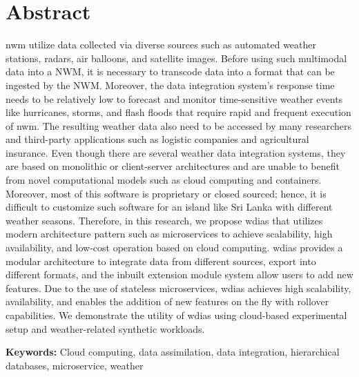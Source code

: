 \documentclass[a4paper,oneside,12pt]{report}
\newcommand{\dbc}[1]{\todo[author=Dilum, inline, color=blue!40]{#1}}
\newcommand{\gkc}[1]{\todo[author=Gihan, inline, color=green!50]{#1}}
\begin{document}
{ 

\chapter*{Abstract}

\acrfull{nwm} utilize data collected via diverse sources such as automated weather stations, radars, air balloons, and satellite images. Before using such multimodal data into a NWM, it is necessary to transcode data into a format that can be ingested by the NWM. Moreover, the data integration system's response time needs to be relatively low to forecast and monitor time-sensitive weather events like hurricanes, storms, and flash floods that require rapid and frequent execution of \acrshort{nwm}. The resulting weather data also need to be accessed by many researchers and third-party applications such as logistic companies and agricultural insurance.
Even though there are several weather data integration systems, they are based on monolithic or client-server architectures and are unable to benefit from novel computational models such as cloud computing and containers. Moreover, most of this software is proprietary or closed sourced; hence, it is difficult to customize such software for an island like Sri Lanka with different weather seasons.
Therefore, in this research, we propose \acrfull{wdias} that utilizes modern architecture pattern such as microservices to achieve scalability, high availability, and low-cost operation based on cloud computing. \acrshort{wdias} provides a modular architecture to integrate data from different sources, export into different formats, and the inbuilt extension module system allow users to add new features. Due to the use of stateless microservices, \acrshort{wdias} achieves high scalability, availability, and enables the addition of new features on the fly with rollover capabilities. We demonstrate the utility of \acrshort{wdias} using cloud-based experimental setup and weather-related synthetic workloads.

\dbc{Increase line space to 1.5}
\gkc{FIXED}
\vspace{4mm}

\textbf{Keywords:} Cloud computing, data assimilation, data integration, hierarchical databases, microservice, weather
}

\restoregeometry
\normalsize
\end{document}
